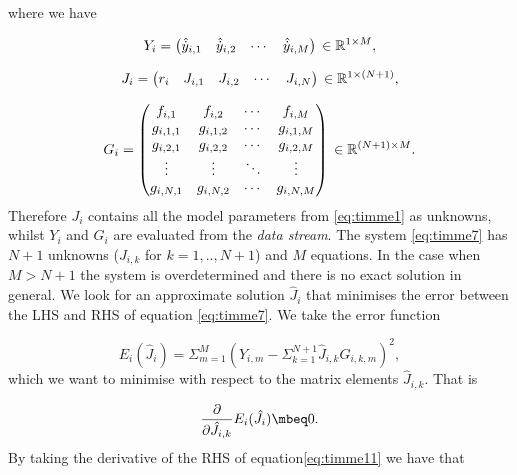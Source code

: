 where we have

\begin{equation}\label{eq:timme8}
Y_{i} = 
\begin{pmatrix}
  \hat{\dot{y}}_{i,1} & \hat{\dot{y}}_{i,2} & \cdots & \hat{\dot{y}}_{i,M}
\end{pmatrix}\\
\in{\mathbb{R}^{1 \times M}},
\end{equation}

\begin{equation}\label{eq:timme9}
J_{i} = 
\begin{pmatrix}
  r_i & J_{i,1} & J_{i,2} & \cdots & J_{i,N}
\end{pmatrix}\\
\in{\mathbb{R}^{1 \times(N+1)}},
\end{equation}

\begin{equation}\label{eq:timme10}
G_{i} = 
\begin{pmatrix}
  f_{i,1}  &    f_{i,2} & \cdots & f_{i,M}         \\
  g_{i,1,1} & g_{i,1,2} & \cdots & g_{i,1,M} \\
  g_{i,2,1} & g_{i,2,2} & \cdots & g_{i,2,M} \\
  \vdots    & \vdots    & \ddots & \vdots    \\
  g_{i,N,1} & g_{i,N,2} & \cdots & g_{i,N,M} \\
\end{pmatrix}\\
\in{\mathbb{R}^{(N+1)\times M}}.
\end{equation}
%
Therefore $J_i$ contains all the model parameters from \eqref{eq:timme1} as unknowns, whilst $Y_i$ and $G_i$ are evaluated from the \emph{data stream}. The system \ref{eq:timme7} has $N+1$ unknowns ($J_{i,k}$ for $k=1,..,N+1$) and $M$ equations. In the case when $M>N+1$ the system is overdetermined and there is no exact solution in general. We look for an approximate solution $\hat{J}_i$ that minimises the error between the LHS and RHS of equation \ref{eq:timme7}. We take the error function

\begin{equation}\label{eq:timme11}
E_i(\hat{J}_i) = \Sigma_{m=1}^{M}(Y_{i,m} - \Sigma_{k=1}^{N+1}\hat{J}_{i,k}G_{i,k,m})^2,
\end{equation}
%
which we want to minimise with respect to the matrix elements $\hat{J}_{i,k}$. That is

\begin{equation}\label{eq:timme12}
\frac{\partial}{\partial \hat{J}_{i,k}} E_i(\hat{J}_i) \mbeq 0.
\end{equation}
%
By taking the derivative of the RHS of equation\ref{eq:timme11} we have that

